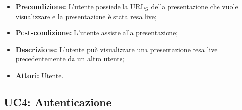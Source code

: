 \begin{itemize}
	\item \textbf{Precondizione:} L'utente possiede la URL$_G$ della presentazione che vuole visualizzare e la presentazione è stata resa live;
	\item \textbf{Post-condizione:} L'utente assiste alla presentazione;
	\item \textbf{Descrizione:} L'utente può visualizzare una presentazione resa live precedentemente da un altro utente;
	\item \textbf{Attori:} Utente.
\end{itemize}
\subsection{ UC4: Autenticazione}

